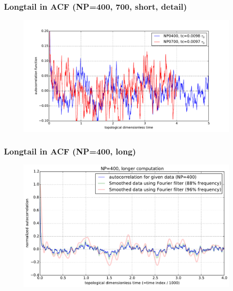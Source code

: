 \documentclass[slidestop, compress, mathserif]{beamer}
\begin{document}
\begin{frame}
  \frametitle<presentation>{Longtail in ACF (NP=400, 700, short, detail)}
  \begin{figure}
    \centering
    \includegraphics[width=\textwidth]{../check_longtail_detail.pdf}
  \end{figure}
\end{frame}


\begin{frame}
  \frametitle<presentation>{Longtail in ACF (NP=400, long)}
  \begin{figure}
    \centering 
    \includegraphics[width=\textwidth]{../longtail_correlation_NP400.pdf}
  \end{figure}
\end{frame}
\end{document}
